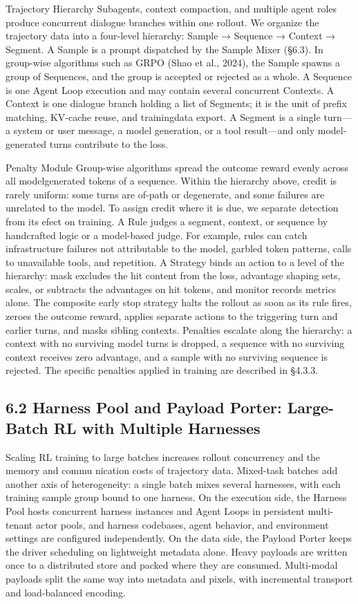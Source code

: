 \documentclass[
  10
]{article}
\begin{document}
Trajectory Hierarchy Subagents, context compaction, and multiple agent
roles produce concurrent dialogue branches within one rollout. We
organize the trajectory data into a four-level hierarchy: Sample →
Sequence → Context → Segment. A Sample is a prompt dispatched by the
Sample Mixer (§6.3). In group-wise algorithms such as GRPO (Shao et al.,
2024), the Sample spawns a group of Sequences, and the group is accepted
or rejected as a whole. A Sequence is one Agent Loop execution and may
contain several concurrent Contexts. A Context is one dialogue branch
holding a list of Segments; it is the unit of prefix matching, KV-cache
reuse, and trainingdata export. A Segment is a single turn---a system or
user message, a model generation, or a tool result---and only
model-generated turns contribute to the loss.

Penalty Module Group-wise algorithms spread the outcome reward evenly
across all modelgenerated tokens of a sequence. Within the hierarchy
above, credit is rarely uniform: some turns are of-path or degenerate,
and some failures are unrelated to the model. To assign credit where it
is due, we separate detection from its efect on training. A Rule judges
a segment, context, or sequence by handcrafted logic or a model-based
judge. For example, rules can catch infrastructure failures not
attributable to the model, garbled token patterns, calls to unavailable
tools, and repetition. A Strategy binds an action to a level of the
hierarchy: mask excludes the hit content from the loss, advantage
shaping sets, scales, or subtracts the advantages on hit tokens, and
monitor records metrics alone. The composite early stop strategy halts
the rollout as soon as its rule fires, zeroes the outcome reward,
applies separate actions to the triggering turn and earlier turns, and
masks sibling contexts. Penalties escalate along the hierarchy: a
context with no surviving model turns is dropped, a sequence with no
surviving context receives zero advantage, and a sample with no
surviving sequence is rejected. The specific penalties applied in
training are described in §4.3.3.

\subsection{6.2 Harness Pool and Payload Porter: Large-Batch RL with
Multiple
Harnesses}\label{harness-pool-and-payload-porter-large-batch-rl-with-multiple-harnesses}

Scaling RL training to large batches increases rollout concurrency and
the memory and commu nication costs of trajectory data. Mixed-task
batches add another axis of heterogeneity: a single batch mixes several
harnesses, with each training sample group bound to one harness. On the
execution side, the Harness Pool hosts concurrent harness instances and
Agent Loops in persistent multi-tenant actor pools, and harness
codebases, agent behavior, and environment settings are configured
independently. On the data side, the Payload Porter keeps the driver
scheduling on lightweight metadata alone. Heavy payloads are written
once to a distributed store and packed where they are consumed.
Multi-modal payloads split the same way into metadata and pixels, with
incremental transport and load-balanced encoding.
\end{document}
